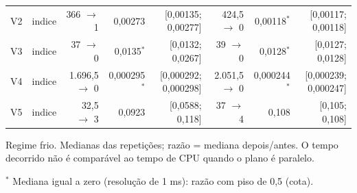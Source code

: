 {\begin{tabular}{llrrrrrr}
V2 & indice & 366 $\to$ 1 & 0,00273 & [0,00135; 0,00277] & 424,5 $\to$ 0 & 0,00118$^{*}$ & [0,00117; 0,00118] \\
V3 & indice & 37 $\to$ 0 & 0,0135$^{*}$ & [0,0132; 0,0267] & 39 $\to$ 0 & 0,0128$^{*}$ & [0,0127; 0,0128] \\
V4 & indice & 1.696,5 $\to$ 0 & 0,000295$^{*}$ & [0,000292; 0,000298] & 2.051,5 $\to$ 0 & 0,000244$^{*}$ & [0,000239; 0,000247] \\
V5 & indice & 32,5 $\to$ 3 & 0,0923 & [0,0588; 0,118] & 37 $\to$ 4 & 0,108 & [0,105; 0,108] \\
\bottomrule
\end{tabular}\par
\vspace{3pt}
\begin{minipage}{\linewidth}\footnotesize
Regime frio. Medianas das repetições; razão = mediana depois/antes. O tempo decorrido não é comparável ao tempo de CPU quando o plano é paralelo.\par
$^{*}$ Mediana igual a zero (resolução de 1 ms): razão com piso de 0,5 (cota).
\end{minipage}
}

